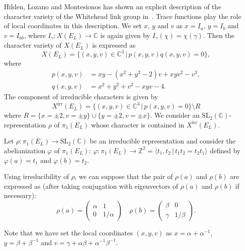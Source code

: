\documentclass[a4paper]{amsart}
\theoremstyle{plain}
\theoremstyle{definition}
\theoremstyle{remark}
\newcommand{\ZZ}{{\mathbb Z}}
\newcommand{\CC}{{\mathbb C}}
\newcommand{\SL}{{\mathrm{SL}_2(\CC)}}
\begin{document}
Hilden, Lozano and Montesionos has shown an
explicit description of the character variety of the Whitehead link
group in~\cite{HLM92:characterization}.  Trace functions play the role
of local coordinates in this description.   We set $x$, $y$ and $v$ as
$x=I_a$, $y=I_b$ and $v=I_{ab}$, where $I_\gamma \colon X(E_L) \to \CC$ is again given by $I_\gamma (\chi) = \chi(\gamma)$.  Then the character variety of
$X(E_L)$ is expressed as
\[
X(E_L) = \{(x, y, v)\in \CC^3 \,|\, p(x, y, v) q(x, y, v) = 0\},
\]
where 
\begin{align*}
  p(x, y, v) &= xy - (x^2 + y^2 - 2)v + xyv^2 - v^3,\\
  q(x, y, v) &= x^2 + y^2 + v^2 -xyv - 4.
\end{align*}
The component of irreducible characters is given by 
\[ 
X^{\mathrm{irr}}(E_L) =\{(x, y, v)\in \CC^3 \,|\, p(x, y, v) = 0\} \setminus R
\]
where $R = \{x = \pm 2, v= \pm y\} \cup \{y = \pm 2, v = \pm x\}$.  We
consider an $\SL$-representation $\rho$ of $\pi_1(E_L)$ whose
character is contained in $X^{\mathrm{irr}}(E_L)$.  

Let $\rho \colon \pi_1(E_L) \to \SL$ be an irreducible representation and consider  
the abelianization $\varphi$ of $\pi_1(E_L)$: $\varphi\colon \pi_1(E_L) \to \ZZ^2 = \langle t_1, t_2 \,|\, t_1t_2 = t_2t_1 \rangle$ defined by $\varphi(a) = t_1$ and $\varphi(b)
= t_2$.  

Using irreducibility of $\rho$, we can suppose that the pair of
$\rho(a)$ and $\rho(b)$ are expressed as (after taking conjugation with eigenvectors of $\rho(a)$ and $\rho(b)$ if necessary):
\[
\rho(a) = 
\left(
  \begin{array}{cc}
    \alpha & 1 \\
    0 & 1/\alpha
  \end{array}
\right)
\quad
\rho(b) = 
\left(
  \begin{array}{cc}
    \beta & 0 \\
    \gamma & 1/\beta
  \end{array}
\right).
\]

Note that we have set the local coordinates $(x, y, v)$ as 
$x = \alpha + \alpha^{-1}$, $y = \beta + \beta^{-1}$ and 
$v = \gamma + \alpha\beta + \alpha^{-1}\beta^{-1}$. 
\end{document}
